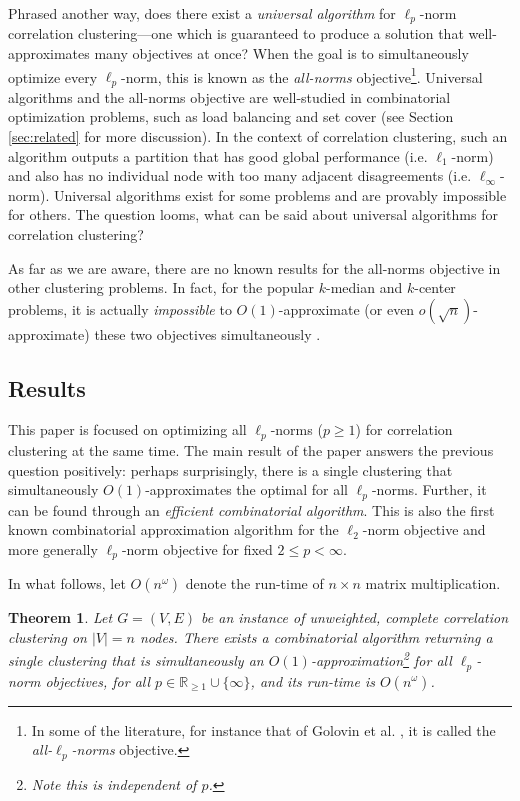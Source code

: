 \documentclass[11pt]{article}
\newtheorem{theorem}{Theorem}
\begin{document}
 Phrased another way, does there exist a \emph{universal algorithm} for $\ell_p$-norm correlation clustering---one which is guaranteed to produce a solution that well-approximates many objectives at once?
When the goal is to simultaneously optimize every $\ell_p$-norm, this is known as the \emph{all-norms} objective\footnote{In some of the literature, for instance that of Golovin et al. \cite{golovin2008all}, it is called the \emph{all-$\ell_p$-norms} objective.}. Universal algorithms and the all-norms objective are well-studied in combinatorial optimization problems, such as load balancing and set cover (see Section \ref{sec:related} for more discussion).  In the context of correlation clustering, such an algorithm outputs a partition that has good global performance (i.e. $\ell_1$-norm) and also has no individual node with too many adjacent disagreements (i.e. $\ell_\infty$-norm). Universal algorithms exist for some problems and are provably impossible for others. The question looms, what can be said about universal algorithms for correlation clustering? 


As far as we are aware, there are no known results for the all-norms objective in other clustering problems. In fact, for the popular $k$-median and $k$-center problems, it is actually \textit{impossible} to $O(1)$-approximate (or even $o(\sqrt{n})$-approximate) these two objectives simultaneously \cite{2018bicriteria}.




\subsection{Results}
This paper is focused on optimizing all $\ell_p$-norms ($p \geq 1$) for correlation clustering at the same time.  The main result of the paper answers the previous question positively: perhaps surprisingly, there is a single clustering that simultaneously $O(1)$-approximates the optimal for all $\ell_p$-norms. Further, it can be found through an \emph{efficient combinatorial algorithm}.   This is also the first known combinatorial approximation algorithm for the $\ell_2$-norm objective and more generally $\ell_p$-norm objective for fixed $2 \leq p < \infty$.  

In what follows, let $O(n^\omega)$ denote the run-time of $n \times n$ matrix multiplication.  

\begin{theorem}\label{thm: main-acm}
Let $G=(V,E)$ be an instance of unweighted, complete correlation clustering on $|V|=n$ nodes. There exists a combinatorial algorithm returning a single clustering that is simultaneously an $O(1)$-approximation\footnote{Note this is independent of $p$.} for all $\ell_p$-norm objectives, for all $p\in \mathbb{R}_{\geq 1} \cup \{\infty\}$, and its run-time is $O(n^\omega)$.
\end{theorem}
\end{document}
